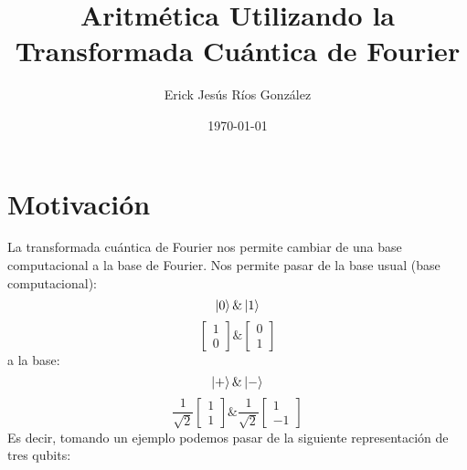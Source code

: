 \documentclass{article}
\title{Aritmética Utilizando la Transformada Cuántica de Fourier }
\author{Erick Jesús Ríos González}
\date{\today}
\begin{document}
\maketitle
\section{Motivación}
La transformada cuántica de Fourier nos permite cambiar de una 
base computacional a la base de Fourier. Nos permite pasar de 
la base usual (base computacional):
\[\ket{0} \& \ket{1}\]
\[\begin{bmatrix}
    1 \\
    0
\end{bmatrix} \&
\begin{bmatrix}
    0\\
    1
\end{bmatrix}\]
a la base:
\[\ket{+} \& \ket{-}\]
\[\frac{1}{\sqrt{2}}\begin{bmatrix}
    1 \\
    1
\end{bmatrix} \&\frac{1}{\sqrt{2}}
\begin{bmatrix}
    1\\
    -1
\end{bmatrix}\]
Es decir, tomando un ejemplo
podemos pasar de la siguiente representación de tres qubits:
\end{document}
